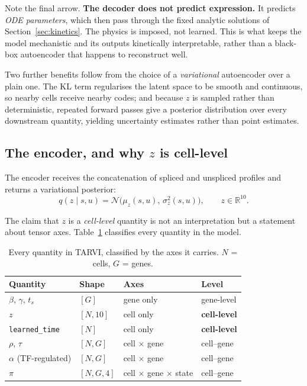 \documentclass[11pt,a4paper]{article}
\newcommand{\uns}{u}
\newcommand{\spl}{s}
\newcommand{\ts}{t_{s}}
\newcommand{\R}{\mathbb{R}}
\theoremstyle{definition}
\begin{document}
Note the final arrow. \textbf{The decoder does not predict expression.} It
predicts \emph{ODE parameters}, which then pass through the fixed analytic
solutions of Section~\ref{sec:kinetics}. The physics is imposed, not learned.
This is what keeps the model mechanistic and its outputs kinetically
interpretable, rather than a black-box autoencoder that happens to reconstruct
well.

Two further benefits follow from the choice of a \emph{variational}
autoencoder over a plain one. The KL term regularises the latent space to be
smooth and continuous, so nearby cells receive nearby codes; and because $z$ is
sampled rather than deterministic, repeated forward passes give a posterior
distribution over every downstream quantity, yielding uncertainty estimates
rather than point estimates.

\subsection{The encoder, and why \texorpdfstring{$z$}{z} is cell-level}
\label{sec:z-cell-level}

The encoder receives the concatenation of spliced and unspliced profiles and
returns a variational posterior:
%
\begin{equation}
q(z \mid \spl, \uns) = \mathcal{N}\big(\mu_z(\spl,\uns),\, \sigma_z^2(\spl,\uns)\big),
\qquad z \in \R^{10}.
\end{equation}

The claim that $z$ is a \emph{cell-level} quantity is not an interpretation but
a statement about tensor axes. Table~\ref{tab:axes} classifies every quantity
in the model.

\begin{table}[h]
\centering
\caption{Every quantity in TARVI, classified by the axes it carries.
$N$ = cells, $G$ = genes.}
\label{tab:axes}
\begin{tabular}{@{}llll@{}}
\toprule
\textbf{Quantity} & \textbf{Shape} & \textbf{Axes} & \textbf{Level} \\
\midrule
$\beta$, $\gamma$, $\ts$      & $[G]$        & gene only          & gene-level \\
$z$                            & $[N, 10]$    & cell only          & \textbf{cell-level} \\
\texttt{learned\_time}         & $[N]$        & cell only          & \textbf{cell-level} \\
$\rho$, $\tau$                 & $[N, G]$     & cell $\times$ gene & cell--gene \\
$\alpha$ (TF-regulated)        & $[N, G]$     & cell $\times$ gene & cell--gene \\
$\pi$                          & $[N, G, 4]$  & cell $\times$ gene $\times$ state & cell--gene \\
\bottomrule
\end{tabular}
\end{table}
\end{document}

